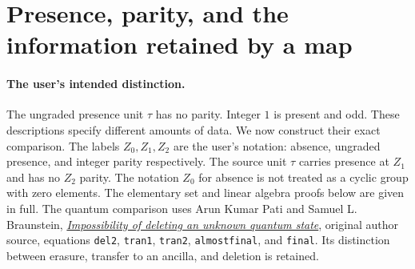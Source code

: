 \section{Presence, parity, and the information retained by a map}
\label{sec:PPI}
\paragraph{The user's intended distinction.}
The ungraded presence unit $\tau$ has no parity. Integer $1$ is
present and odd. These descriptions specify different amounts of
data. We now construct their exact comparison. The labels $Z_0,Z_1,Z_2$ are the user's notation: absence,
ungraded presence, and integer parity respectively. The source
unit $\tau$ carries presence at $Z_1$ and has no $Z_2$ parity.
The notation $Z_0$ for absence is not treated
as a cyclic group with zero elements. The elementary set and linear
algebra proofs below are given in full. The quantum comparison uses
Arun Kumar Pati and Samuel L. Braunstein,
\href{https://arxiv.org/abs/quant-ph/9911090v2}{\emph{Impossibility of
deleting an unknown quantum state}}, original author source,
equations \texttt{del2}, \texttt{tran1}, \texttt{tran2},
\texttt{almostfinal}, and \texttt{final}. Its distinction between
erasure, transfer to an ancilla, and deletion is retained.

